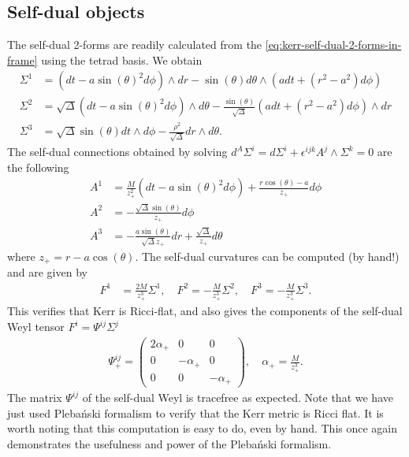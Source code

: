 \documentclass[10pt]{report}
\newcommand{\pleb}[0]{Pleba\'nski}
\theoremstyle{definition}
\begin{document}
\subsection{Self-dual objects}

The self-dual 2-forms are readily calculated from the \cref{eq:kerr-self-dual-2-forms-in-frame} using the tetrad basis. We obtain 
\begin{align}
    \Sigma^1 &= (dt-a\sin(\theta)^2 d\phi) \wedge dr - \sin(\theta) d\theta \wedge (a dt + (r^2-a^2) d\phi)\\
    \Sigma^2 &= \sqrt{\Delta}(dt-a\sin(\theta)^2 d\phi) \wedge d\theta -\frac{\sin(\theta)}{\sqrt{\Delta}}(a dt + (r^2-a^2) d\phi) \wedge dr \\
    \Sigma^3 &= \sqrt{\Delta} \sin(\theta) dt \wedge d\phi - \frac{\rho^2}{\sqrt{\Delta}} dr \wedge d\theta.
\end{align}
The self-dual connections obtained by solving $d^A \Sigma^i = d\Sigma^i + \epsilon^{ijk} A^j \wedge \Sigma^k = 0$ are the following 
\begin{align}
    A^1 &= \frac{M}{z_+^2} (dt - a\sin(\theta)^2 d\phi) + \frac{r\cos(\theta) - a}{z_+} d\phi \\
    A^2 &= -\frac{\sqrt{\Delta}\sin(\theta)}{z_+} d\phi \\
    A^3 &= -\frac{a\sin(\theta)}{\sqrt{\Delta} z_+} dr + \frac{\sqrt{\Delta}}{z_+} d\theta
\end{align}
where $z_+ = r-a \cos(\theta)$.
The self-dual curvatures can be computed (by hand!) and are given by
\begin{align}
    F^1 &= \frac{2M}{z_+^3}  \Sigma^1,\quad F^2 = -\frac{M}{z_+^3} \Sigma^2, \quad F^3 = -\frac{M}{z_+^3} \Sigma^3.
\end{align}
This verifies that Kerr is Ricci-flat, and also gives the components of the self-dual Weyl tensor $F^i = \Psi^{ij} \Sigma^j$ 
\begin{align}
    \Psi^{ij}_+ = \begin{pmatrix}
        2\alpha_+ & 0 & 0 \\
        0 & -\alpha_+ & 0 \\
        0 & 0 & -\alpha_+
    \end{pmatrix}, \quad \alpha_+ = \frac{M}{z_+^3}.
\end{align}
The matrix $\Psi^{ij}$ of the self-dual Weyl is tracefree as expected. Note that we have just used \pleb{} formalism to verify that the Kerr metric is Ricci flat. It is worth noting that this computation is easy to do, even by hand. This once again demonstrates the usefulness and power of the \pleb{} formalism. 
\end{document}
